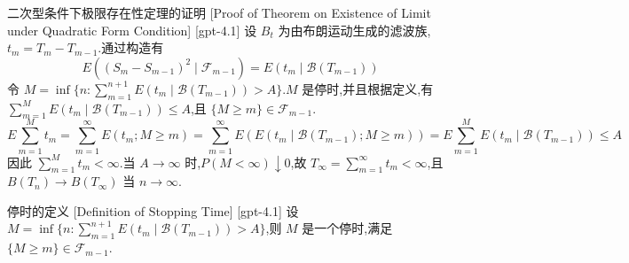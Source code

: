 \documentclass[UTF8]{ctexart}
\begin{document}
    \begin{prf}
        {二次型条件下极限存在性定理的证明}
        [Proof of Theorem on Existence of Limit under Quadratic Form Condition]
        [gpt-4.1]
        设 $B_{t}$ 为由布朗运动生成的滤波族,$t_{m} = T_{m} - T_{m-1}$.通过构造有
\[
E( ( S_{m} - S_{m-1} )^{2} \mid \mathcal{F}_{m-1} ) = E( t_{m} \mid \mathcal{B}( T_{m-1} ) )
\]
令 $M = \inf \{ n : \sum_{m=1}^{n+1} E( t_{m} \mid \mathcal{B}( T_{m-1} ) ) > A \}$.$M$ 是停时,并且根据定义,有 $\sum_{m=1}^{M} E( t_{m} \mid \mathcal{B}( T_{m-1} ) ) \leq A$,且 $\{ M \geq m \} \in \mathcal{F}_{m-1}$.
\[
E \sum_{m=1}^{M} t_{m} = \sum_{m=1}^{\infty} E( t_{m}; M \geq m ) = \sum_{m=1}^{\infty} E( E( t_{m} \mid \mathcal{B}( T_{m-1} ); M \geq m ) ) = E \sum_{m=1}^{M} E( t_{m} \mid \mathcal{B}( T_{m-1} ) ) \leq A
\]
因此 $\sum_{m=1}^{M} t_{m} < \infty$.当 $A \to \infty$ 时,$P( M < \infty ) \downarrow 0$,故 $T_{\infty} = \sum_{m=1}^{\infty} t_{m} < \infty$,且 $B( T_{n} ) \to B( T_{\infty} )$ 当 $n \to \infty$.
    \end{prf}
    
    
    
    \begin{dfn}
        {停时的定义}
        [Definition of Stopping Time]
        [gpt-4.1]
        设 $M = \inf \{ n : \sum_{m=1}^{n+1} E( t_{m} \mid \mathcal{B}( T_{m-1} ) ) > A \}$,则 $M$ 是一个停时,满足 $\{ M \geq m \} \in \mathcal{F}_{m-1}$.
    \end{dfn}
    
    
    
\end{document}
